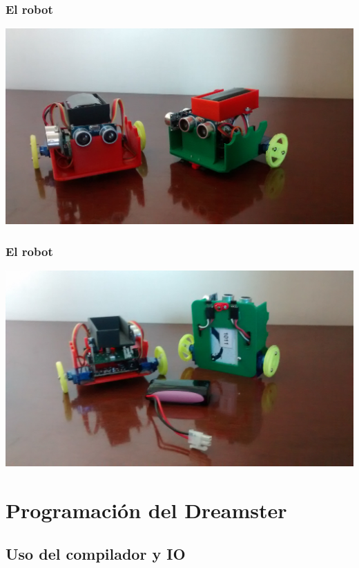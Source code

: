 \documentclass[compress]{beamer}
\begin{document}
\begin{frame}
 \frametitle{El robot}
 \begin{center}
 \includegraphics[height=0.8\textheight]{./img/dreamster-top.jpg} 
 \end{center}
\end{frame}

\begin{frame}
 \frametitle{El robot}
 \begin{center}
 \includegraphics[height=0.8\textheight]{./img/dreamster-back.jpg} 
 \end{center}
\end{frame}

\section{Programación del Dreamster}
\subsection{Uso del compilador y IO}
\end{document}

